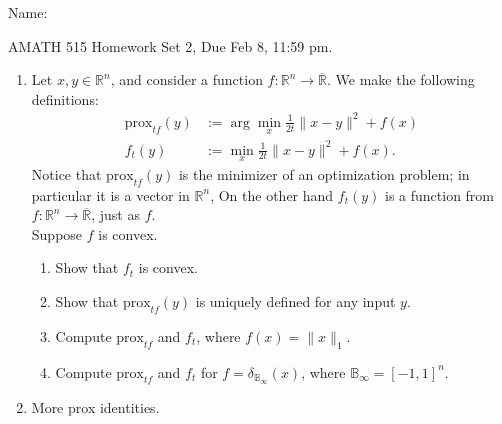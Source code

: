 \documentclass[11pt]{amsart}
\newcommand{\prox}{\mathrm{prox}}
\begin{document}
{\Large Name:}  \\
\begin{center}
\Large AMATH 515 \hskip 1in Homework Set 2, Due Feb 8, 11:59 pm. \\
\end{center}
\vskip 32pt

\begin{enumerate}



\item Let $x, y\in \mathbb{R}^n$, and consider a function $f: \mathbb{R}^n \rightarrow\overline {\mathbb{R}}$.
We make the following definitions: 
\[
\begin{aligned}
\mbox{prox}_{t f}(y) &:= \arg\min_{x} \frac{1}{2t}\|x-y\|^2 + f(x)\\
f_t(y) &:= \min_x \frac{1}{2t}\|x-y\|^2 + f(x).
\end{aligned}
\] 
Notice that $\mbox{prox}_{t f}(y)$ is the minimizer of an optimization problem; in particular it is a vector in $\mathbb{R}^n$, 
On the other hand $f_t(y)$ is a function from $f: \mathbb{R}^n \rightarrow\overline {\mathbb{R}}$, just as $f$. \\



Suppose $f$ is convex.
\vskip 16pt
\begin{enumerate}

\item Show that $f_t$ is convex.  
\bigskip

\item  Show that $\prox_{t f}(y)$ is uniquely defined for any input $y$. 
\bigskip

\item Compute $\prox_{t f}$ and $f_t$, where $f(x) = \|x\|_1$. 
\bigskip
\item Compute $\prox_{t f}$ and $f_t$ for $f = \delta_{\mathbb{B}_{\infty}}(x)$, 
where $\mathbb{B}_\infty = [-1,1]^n$.

\bigskip
\end{enumerate}

\vskip 32pt

\item More prox identities. 
\vskip 16pt
\begin{enumerate}


\end{enumerate}
\end{enumerate}
\end{document}
